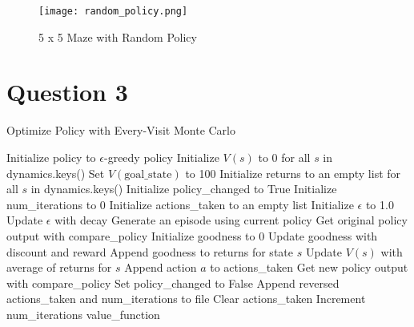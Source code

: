 \documentclass[letterpaper]{article} %
\begin{document}
	\begin{figure}[htbp]
	  \centering
	  \texttt{[image: random\_policy.png]}
	  \caption{5 x 5 Maze with Random Policy}
	  \label{fig:random_policy}
	\end{figure}

\section{Question 3}
    \begin{algorithm}
    \caption{Optimize Policy with Every-Visit Monte Carlo}
    \begin{algorithmic}[1]
    \State Initialize policy to $\epsilon$-greedy policy \label{alg:greedy_policy}
    \State Initialize $V(s)$ to 0 for all $s$ in dynamics.keys()
	\State Set $V(\text{goal\_state})$ to 100 \label{alg:high_value_goal}
    \State Initialize returns to an empty list for all $s$ in dynamics.keys()
    \State Initialize policy\_changed to True
    \State Initialize num\_iterations to 0
    \State Initialize actions\_taken to an empty list
    \State Initialize $\epsilon$ to 1.0
	\State Update $\epsilon$ with decay
	\State Generate an episode using current policy
	\State Get original policy output with compare\_policy
	\State Initialize goodness to 0
	\label{alg:reversed_episode}
	    \State Update goodness with discount and reward
	    \State Append goodness to returns for state $s$
	    \State Update $V(s)$ with average of returns for $s$
	    \State Append action $a$ to actions\_taken
	\EndFor
	\State Get new policy output with compare\_policy \label{alg:action_compare}
	    \State Set policy\_changed to False
	    \State Append reversed actions\_taken and num\_iterations to file
	\EndIf
	\State Clear actions\_taken
	\State Increment num\_iterations
    \EndWhile
    \State \Return value\_function
    \end{algorithmic}
      \label{alg:every_visit_mc}
    \end{algorithm}
\end{document}
